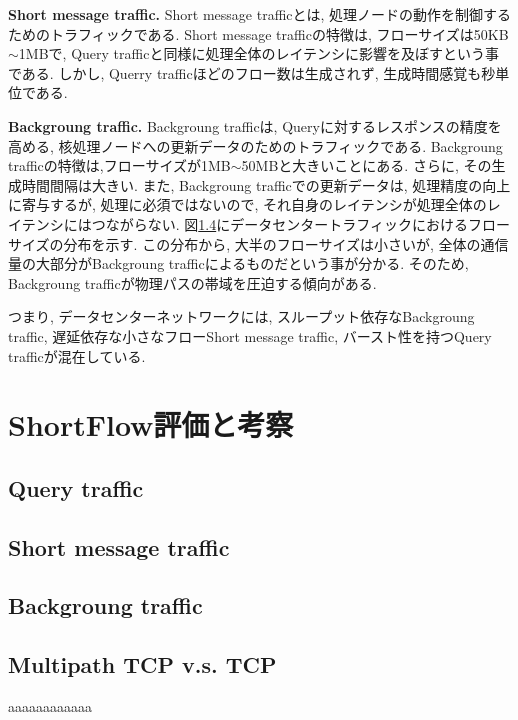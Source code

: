 \documentclass{ieicej}
\begin{document}
{\bf Short message traffic. } Short message trafficとは,
処理ノードの動作を制御するためのトラフィックである.
Short message trafficの特徴は, フローサイズは50KB$\sim$1MBで, Query
trafficと同様に処理全体のレイテンシに影響を及ぼすという事である.
しかし, Querry trafficほどのフロー数は生成されず, 生成時間感覚も秒単位である.

{\bf Backgroung traffic. }Backgroung trafficは, Queryに対するレスポンスの精度を高める,
核処理ノードへの更新データのためのトラフィックである.
Backgroung trafficの特徴は,フローサイズが1MB$\sim$50MBと大きいことにある.
さらに, その生成時間間隔は大きい.
また, Backgroung trafficでの更新データは, 処理精度の向上に寄与するが, 処理に必須ではないので,
それ自身のレイテンシが処理全体のレイテンシにはつながらない.
図\ref{}にデータセンタートラフィックにおけるフローサイズの分布を示す.
この分布から, 大半のフローサイズは小さいが, 全体の通信量の大部分がBackgroung trafficによるものだという事が分かる.
そのため, Backgroung trafficが物理パスの帯域を圧迫する傾向がある.

つまり, データセンターネットワークには, スループット依存なBackgroung traffic, 遅延依存な小さなフローShort message
traffic, バースト性を持つQuery trafficが混在している.


\section{ShortFlow評価と考察}

\subsection{Query traffic}

\subsection{Short message traffic}

\subsection{Backgroung traffic}

\subsection{Multipath TCP v.s. TCP}

aaaaaaaaaaaa
\end{document}
